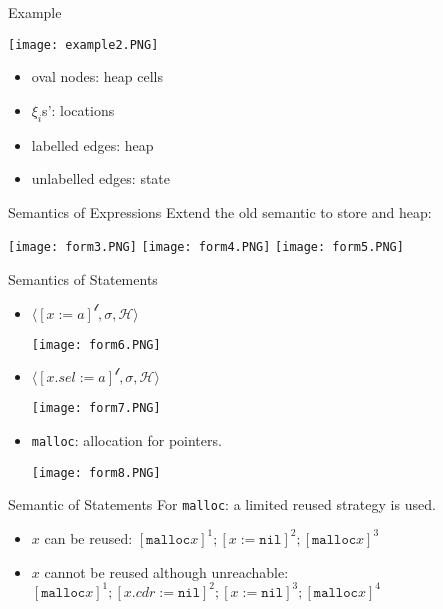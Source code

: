 \documentclass[aspectratio=1610, 13pt]{beamer}
\begin{document}
\begin{frame}{Example}
    \begin{center}
        \texttt{[image: example2.PNG]}
\end{center}
\begin{itemize}
    \item 
oval nodes: heap cells
\item 
$\xi_i$s': locations
\item labelled edges: heap
\item unlabelled edges: state
\end{itemize}

\end{frame}
\begin{frame}{Semantics of Expressions}
    Extend the old semantic to store and heap:
    \begin{center}
        \texttt{[image: form3.PNG]}
        \texttt{[image: form4.PNG]}
        \texttt{[image: form5.PNG]}
\end{center}
\end{frame}

\begin{frame}{Semantics of Statements}

\begin{itemize}
    \item  $\langle [x:= a]^{\mathcal{l}}, \sigma, \mathcal{H}\rangle$
    \begin{center}
        \texttt{[image: form6.PNG]}
\end{center}
    \item $\langle [x.sel := a]^{\mathcal{l}}, \sigma, \mathcal{H}\rangle$
    \begin{center}
        \texttt{[image: form7.PNG]}
\end{center}
    \item \texttt{malloc}: allocation for pointers.
    \begin{center}
        \texttt{[image: form8.PNG]}
\end{center}
\end{itemize}
\end{frame}
\begin{frame}{Semantic of Statements}
    For \texttt{malloc}: a limited reused strategy is used.
    \begin{itemize}
        \item $x$ can be reused: $[\texttt{malloc} x]^1; [x := \texttt{nil}]^2; [\texttt{malloc} x]^3$
        
        \item $x$ cannot be reused although unreachable: $[\texttt{malloc} x]^1; [x.cdr := \texttt{nil}]^2; [x := \texttt{nil}]^3; [\texttt{malloc} x]^4$
    \end{itemize}
\end{frame}
\end{document}
